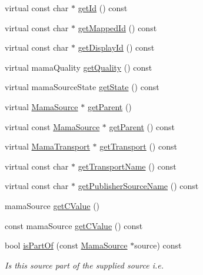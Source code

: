 \begin{DoxyCompactItemize}
\item 
virtual const char $\ast$ \hyperlink{classWombat_1_1MamaSource_aada09147719738f93d3c1a0ce57f095b}{getId} () const 
\item 
virtual const char $\ast$ \hyperlink{classWombat_1_1MamaSource_a2e80dace8d0834620f2c706274a566ec}{getMappedId} () const 
\item 
virtual const char $\ast$ \hyperlink{classWombat_1_1MamaSource_ae1571306a43aaf9cc5cfb360eefb36f4}{getDisplayId} () const 
\item 
virtual mamaQuality \hyperlink{classWombat_1_1MamaSource_a5859d625c3a226b9a4dee940504ee81e}{getQuality} () const 
\item 
virtual mamaSourceState \hyperlink{classWombat_1_1MamaSource_a798167fdd8717dab1954b2329f8f612f}{getState} () const 
\item 
virtual \hyperlink{classWombat_1_1MamaSource}{MamaSource} $\ast$ \hyperlink{classWombat_1_1MamaSource_afce8ee5fabfb0a92c0727cdc00cee0e2}{getParent} ()
\item 
virtual const \hyperlink{classWombat_1_1MamaSource}{MamaSource} $\ast$ \hyperlink{classWombat_1_1MamaSource_a38ff9e474d0a12bd86b161214bc5eeb0}{getParent} () const 
\item 
virtual \hyperlink{classWombat_1_1MamaTransport}{MamaTransport} $\ast$ \hyperlink{classWombat_1_1MamaSource_a6c7cba3c44c57cce76be998909eac57a}{getTransport} () const 
\item 
virtual const char $\ast$ \hyperlink{classWombat_1_1MamaSource_af7c56d50e0bdb321b2214b82e0202265}{getTransportName} () const 
\item 
virtual const char $\ast$ \hyperlink{classWombat_1_1MamaSource_a3e800a64210eaf96e8fbb7fcee94a464}{getPublisherSourceName} () const 
\item 
mamaSource \hyperlink{classWombat_1_1MamaSource_a84f406ac743b6b1bbad5adfc8e14db3c}{getCValue} ()
\item 
const mamaSource \hyperlink{classWombat_1_1MamaSource_a53b49953e08d89062dd97e476e1a2e02}{getCValue} () const 
\item 
bool \hyperlink{classWombat_1_1MamaSource_a16a0fa61551e7ab73a85fcd89b812c99}{isPartOf} (const \hyperlink{classWombat_1_1MamaSource}{MamaSource} $\ast$source) const 
\begin{DoxyCompactList}\small\item\em Is this source part of the supplied source i.e. \item\end{DoxyCompactList}\item 

\end{DoxyCompactItemize}
